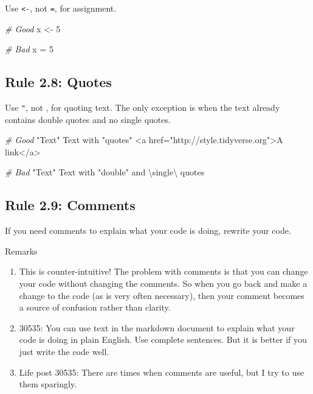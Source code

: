 \documentclass[
  letterpaper,
  DIV=11,
  numbers=noendperiod]{scrreprt}
\newenvironment{Shaded}{\begin{snugshade}}{\end{snugshade}}
\newcommand{\CommentTok}[1]{\textcolor[rgb]{0.38,0.63,0.69}{\textit{#1}}}
\newcommand{\DecValTok}[1]{\textcolor[rgb]{0.25,0.63,0.44}{#1}}
\newcommand{\NormalTok}[1]{\textcolor[rgb]{0.00,0.44,0.13}{#1}}
\newcommand{\OtherTok}[1]{\textcolor[rgb]{0.00,0.44,0.13}{#1}}
\newcommand{\SpecialCharTok}[1]{\textcolor[rgb]{0.25,0.44,0.63}{#1}}
\newcommand{\StringTok}[1]{\textcolor[rgb]{0.25,0.44,0.63}{#1}}
\begin{document}
Use \texttt{\textless{}-}, not \texttt{=}, for assignment.

\begin{Shaded}
\begin{Highlighting}[]
\CommentTok{\# Good}
\NormalTok{x }\OtherTok{\textless{}{-}} \DecValTok{5}

\CommentTok{\# Bad}
\NormalTok{x }\OtherTok{=} \DecValTok{5}
\end{Highlighting}
\end{Shaded}

\hypertarget{rule-2.8-quotes}{%
\subsection{Rule 2.8: Quotes}\label{rule-2.8-quotes}}

Use \texttt{"}, not \texttt{\textquotesingle{}}, for quoting text. The
only exception is when the text already contains double quotes and no
single quotes.

\begin{Shaded}
\begin{Highlighting}[]
\CommentTok{\# Good}
\StringTok{"Text"}
\StringTok{\textquotesingle{}Text with "quotes"\textquotesingle{}}
\StringTok{\textquotesingle{}\textless{}a href="http://style.tidyverse.org"\textgreater{}A link\textless{}/a\textgreater{}\textquotesingle{}}

\CommentTok{\# Bad}
\StringTok{"Text"}
\StringTok{\textquotesingle{}Text with "double" and }\SpecialCharTok{\textbackslash{}\textquotesingle{}}\StringTok{single}\SpecialCharTok{\textbackslash{}\textquotesingle{}}\StringTok{ quotes\textquotesingle{}}
\end{Highlighting}
\end{Shaded}

\hypertarget{rule-2.9-comments}{%
\subsection{Rule 2.9: Comments}\label{rule-2.9-comments}}

If you need comments to explain what your code is doing, rewrite your
code.

Remarks

\begin{enumerate}
\def\labelenumi{\arabic{enumi}.}
\item
  This is counter-intuitive! The problem with comments is that you can
  change your code without changing the comments. So when you go back
  and make a change to the code (as is very often necessary), then your
  comment becomes a source of confusion rather than clarity.
\item
  30535: You can use text in the markdown document to explain what your
  code is doing in plain English. Use complete sentences. But it is
  better if you just write the code well.
\item
  Life post 30535: There are times when comments are useful, but I try
  to use them sparingly.
\end{enumerate}
\end{document}

